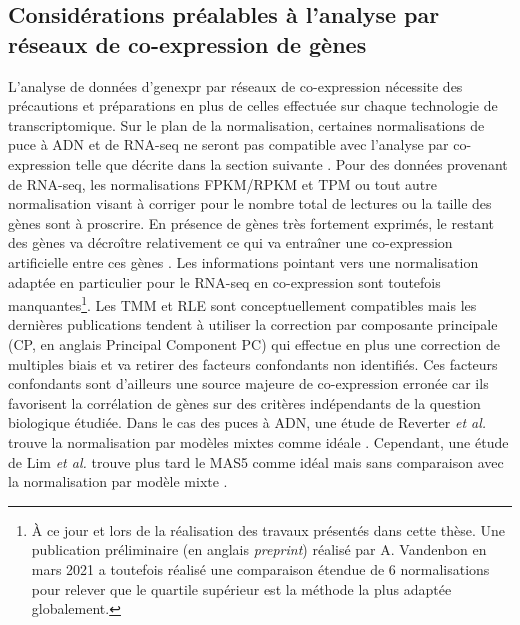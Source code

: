 \subsection{Considérations préalables à l'analyse par réseaux de co-expression de gènes}

L'analyse de données d'\gls{genexpr} par réseaux de co-expression nécessite des précautions et préparations en plus de celles effectuée sur chaque technologie de \gls{transcriptomique}. Sur le plan de la normalisation, certaines normalisations de puce à \acrshort{ADN} et de \acrshort{RNA-seq} ne seront pas compatible avec l'analyse par co-expression telle que décrite dans la section suivante \cite{Zhang2005a}. Pour des données provenant de \acrshort{RNA-seq}, les normalisations \acrshort{FPKM}/\acrshort{RPKM} et \acrshort{TPM} ou tout autre normalisation visant à corriger pour le nombre total de lectures ou la taille des gènes sont à proscrire. En présence de gènes très fortement exprimés, le restant des gènes va décroître relativement ce qui va entraîner une co-expression artificielle entre ces gènes \cite{Spiko2017thesis}. Les informations pointant vers une normalisation adaptée en particulier pour le \acrshort{RNA-seq} en co-expression sont toutefois manquantes\footnote{À ce jour et lors de la réalisation des travaux présentés dans cette thèse. Une publication préliminaire (en anglais \textit{preprint}) réalisé par A. Vandenbon en mars 2021 \cite{Vandenbon2021Mar} a toutefois réalisé une comparaison étendue de 6 normalisations pour relever que le quartile supérieur est la méthode la plus adaptée globalement.}. Les \acrshort{TMM} et \acrshort{RLE} sont conceptuellement compatibles mais les dernières publications tendent à utiliser la correction par composante principale (\acrshort{CP}, en anglais Principal Component \acrshort{PC}) \cite{Parsana2019} qui effectue en plus une correction de multiples biais et va retirer des facteurs confondants non identifiés. Ces facteurs confondants sont d'ailleurs une source majeure de co-expression erronée car ils favorisent la corrélation de gènes sur des critères indépendants de la question biologique étudiée. Dans le cas des puces à \acrshort{ADN}, une étude de Reverter \textit{et al.} trouve la normalisation par modèles mixtes comme idéale \cite{Reverter2005Apr}. Cependant, une étude de Lim \textit{et al.} trouve plus tard le MAS5 comme idéal mais sans comparaison avec la normalisation par modèle mixte \cite{Lim2007Jul}.

